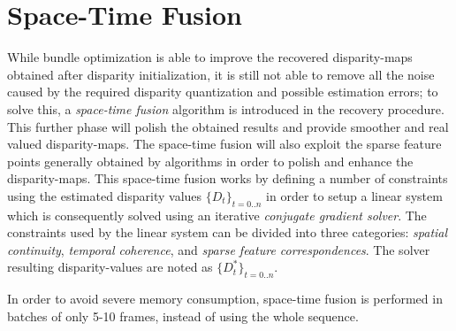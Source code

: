 \section{Space-Time Fusion}\label{sec:spacetime_fusion}
While bundle optimization is able to improve the recovered disparity-maps obtained after disparity initialization, it is still not able to remove all the noise caused by the required disparity quantization and possible estimation errors; to solve this, a \emph{space-time fusion} algorithm is introduced in the recovery procedure. This further phase will polish the obtained results and provide smoother and real valued disparity-maps.
The space-time fusion will also exploit the sparse feature points generally obtained by \SFM{} algorithms in order to polish and enhance the disparity-maps.
This space-time fusion works by defining a number of constraints using the estimated disparity values $\{D_t\}_{t=0..n}$ in order to setup a linear system which is consequently solved using an iterative \emph{conjugate gradient solver}. The constraints used by the linear system can be divided into three categories:
\emph{spatial continuity}, \emph{temporal coherence}, and \emph{sparse feature correspondences}.
The solver resulting disparity-values are noted  as $\{D^*_t\}_{t=0..n}$.\\

\begin{Note}
In order to avoid severe memory consumption, space-time fusion is performed in batches of only 5-10 frames, instead of using the whole sequence.
\end{Note}


